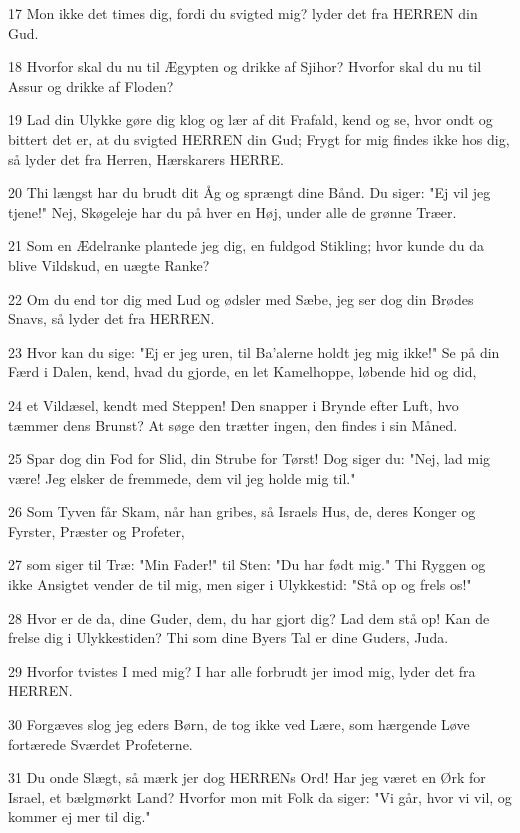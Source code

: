 \par 17 Mon ikke det times dig, fordi du svigted mig? lyder det fra HERREN din Gud.
\par 18 Hvorfor skal du nu til Ægypten og drikke af Sjihor? Hvorfor skal du nu til Assur og drikke af Floden?
\par 19 Lad din Ulykke gøre dig klog og lær af dit Frafald, kend og se, hvor ondt og bittert det er, at du svigted HERREN din Gud; Frygt for mig findes ikke hos dig, så lyder det fra Herren, Hærskarers HERRE.
\par 20 Thi længst har du brudt dit Åg og sprængt dine Bånd. Du siger: "Ej vil jeg tjene!" Nej, Skøgeleje har du på hver en Høj, under alle de grønne Træer.
\par 21 Som en Ædelranke plantede jeg dig, en fuldgod Stikling; hvor kunde du da blive Vildskud, en uægte Ranke?
\par 22 Om du end tor dig med Lud og ødsler med Sæbe, jeg ser dog din Brødes Snavs, så lyder det fra HERREN.
\par 23 Hvor kan du sige: "Ej er jeg uren, til Ba'alerne holdt jeg mig ikke!" Se på din Færd i Dalen, kend, hvad du gjorde, en let Kamelhoppe, løbende hid og did,
\par 24 et Vildæsel, kendt med Steppen! Den snapper i Brynde efter Luft, hvo tæmmer dens Brunst? At søge den trætter ingen, den findes i sin Måned.
\par 25 Spar dog din Fod for Slid, din Strube for Tørst! Dog siger du: "Nej, lad mig være! Jeg elsker de fremmede, dem vil jeg holde mig til."
\par 26 Som Tyven får Skam, når han gribes, så Israels Hus, de, deres Konger og Fyrster, Præster og Profeter,
\par 27 som siger til Træ: "Min Fader!" til Sten: "Du har født mig." Thi Ryggen og ikke Ansigtet vender de til mig, men siger i Ulykkestid: "Stå op og frels os!"
\par 28 Hvor er de da, dine Guder, dem, du har gjort dig? Lad dem stå op! Kan de frelse dig i Ulykkestiden? Thi som dine Byers Tal er dine Guders, Juda.
\par 29 Hvorfor tvistes I med mig? I har alle forbrudt jer imod mig, lyder det fra HERREN.
\par 30 Forgæves slog jeg eders Børn, de tog ikke ved Lære, som hærgende Løve fortærede Sværdet Profeterne.
\par 31 Du onde Slægt, så mærk jer dog HERRENs Ord! Har jeg været en Ørk for Israel, et bælgmørkt Land? Hvorfor mon mit Folk da siger: "Vi går, hvor vi vil, og kommer ej mer til dig."
